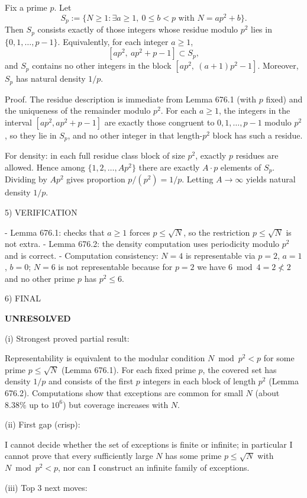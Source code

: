 Fix a prime $p$. Let
\[
S_p:=\{N\ge 1: \exists a\ge 1,\ 0\le b<p\text{ with }N=ap^2+b\}.
\]
Then $S_p$ consists exactly of those integers whose residue modulo $p^2$ lies in $\{0,1,\dots,p-1\}$. Equivalently, for each integer $a\ge 1$,
\[
 [ap^2,\ ap^2+p-1]\subset S_p,
\]
and $S_p$ contains no other integers in the block $[ap^2,\ (a+1)p^2-1]$.
Moreover, $S_p$ has natural density $1/p$.

Proof.
The residue description is immediate from Lemma 676.1 (with $p$ fixed) and the uniqueness of the remainder modulo $p^2$.
For each $a\ge 1$, the integers in the interval $[ap^2,ap^2+p-1]$ are exactly those congruent to $0,1,\dots,p-1$ modulo $p^2$, so they lie in $S_p$, and no other integer in that length-$p^2$ block has such a residue.

For density: in each full residue class block of size $p^2$, exactly $p$ residues are allowed. Hence among $\{1,2,\dots,Ap^2\}$ there are exactly $A\cdot p$ elements of $S_p$. Dividing by $Ap^2$ gives proportion $p/(p^2)=1/p$. Letting $A\to\infty$ yields natural density $1/p$.


5) VERIFICATION

- Lemma 676.1: checks that $a\ge 1$ forces $p\le\sqrt N$, so the restriction $p\le\sqrt N$ is not extra.
- Lemma 676.2: the density computation uses periodicity modulo $p^2$ and is correct.
- Computation consistency: $N=4$ is representable via $p=2$, $a=1$, $b=0$; $N=6$ is not representable because for $p=2$ we have $6\bmod 4=2\not<2$ and no other prime $p$ has $p^2\le 6$.

6) FINAL

\textbf{UNRESOLVED}

(i) Strongest proved partial result:

Representability is equivalent to the modular condition $N\bmod p^2<p$ for some prime $p\le\sqrt N$ (Lemma 676.1). For each fixed prime $p$, the covered set has density $1/p$ and consists of the first $p$ integers in each block of length $p^2$ (Lemma 676.2). Computations show that exceptions are common for small $N$ (about $8.38\%$ up to $10^6$) but coverage increases with $N$.

(ii) First gap (crisp):

I cannot decide whether the set of exceptions is finite or infinite; in particular I cannot prove that every sufficiently large $N$ has some prime $p\le\sqrt N$ with $N\bmod p^2<p$, nor can I construct an infinite family of exceptions.

(iii) Top 3 next moves:

